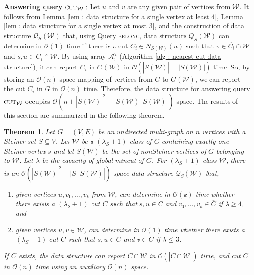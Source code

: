 \documentclass[letterpaper,11pt]{article}
\newtheorem{theorem}{Theorem}[]
\begin{document}
\noindent
\textbf{Answering query} $\textsc{cut}_{\mathcal W}:$ Let $u$ and $v$ are any given pair of vertices from ${\mathcal W}$. It follows from Lemma \ref{lem : data structure for a single vertex at least 4}, Lemma \ref{lem : data structure for a single vertex at most 3}, and the construction of data structure ${\mathcal Q}_S({\mathcal W})$ that, using Query \textsc{belong}, data structure $Q_S({\mathcal W})$ can determine in ${\mathcal O}(1)$ time if there is a cut $C_i\in N_{S({\mathcal W})}(u)$ such that $v \in \overline{C_i}\cap {\mathcal W}$ and $s,u\in C_i\cap {\mathcal W}$. By using array ${\mathcal A}_i^u$ (Algorithm \ref{alg : nearest cut data structure}), it can report $C_i$ in $G({\mathcal W})$ in ${\mathcal O}(|{\overline{S({\mathcal W})}}|+|S({\mathcal W})|)$ time.
So, by storing an ${\mathcal O}(n)$ space mapping of vertices from $G$ to $G({\mathcal W})$, we can report the cut $C_i$ in $G$ in ${\mathcal O}(n)$ time. Therefore, the data structure for answering query $\textsc{cut}_{\mathcal W}$ occupies ${\mathcal O}(n+|\overline{S({\mathcal W})}|^2+|\overline{S({\mathcal W})}||S({\mathcal W})|)$ space. The results of this section are summarized in the following theorem. 
\begin{theorem} \label{thm : data structure for singleton class}
    Let $G=(V,E)$ be an undirected multi-graph on $n$ vertices with a Steiner set $S\subseteq V$. Let ${\mathcal W}$ be a $(\lambda_S+1)$ class of $G$ containing exactly one Steiner vertex $s$ and let $\overline{S({\mathcal W})}$ be the set of nonSteiner vertices of $G$ belonging to ${\mathcal W}$. Let $\lambda$ be the capacity of global mincut of $G$. For  $(\lambda_S+1)$ class ${\mathcal W}$, there is an ${\mathcal O}(|\overline{S({\mathcal W})}|^2+|S||\overline{S({\mathcal W})}|)$ space data structure ${\mathcal Q}_S({\mathcal W})$ that,
    \begin{enumerate}
        \item given vertices $u,v_1,\ldots,v_k$ from ${\mathcal W}$, can determine in ${\mathcal O}(k)$ time whether there exists a $(\lambda_S+1)$ cut $C$ such that $s,u\in C$ and $v_1,\ldots,v_k\in \overline{C}$ if $\lambda\ge 4$, and
        \item given vertices $u,v\in {\mathcal W}$, can determine in ${\mathcal O}(1)$ time whether there exists a $(\lambda_S+1)$ cut $C$ such that $s,u\in C$ and $v\in \overline{C}$ if $\lambda\le 3$.
    \end{enumerate}
    If $C$ exists, the data structure can report $\overline{C}\cap {\mathcal W}$ in ${\mathcal O}(|\overline{C}\cap {\mathcal W}|)$ time, and cut $C$ in ${\mathcal O}(n)$ time using an auxiliary ${\mathcal O}(n)$ space. 
\end{theorem}
\end{document}
